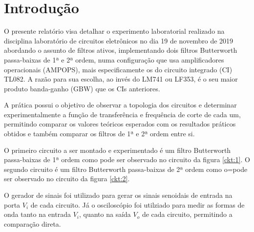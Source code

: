 \section{Introdução}

O presente relatório visa detalhar o experimento laboratorial realizado na disciplina laboratório de circuitos eletrônicos no dia 19 de novembro de 2019 abordando o assunto de filtros ativos, implementando dois filtros Butterworth passa-baixas de 1ª e 2ª ordem, numa configuração que usa   amplificadores operacionais (AMPOPS), mais especificamente os do circuito integrado (CI) TL082. A razão para sua escolha, ao invés do LM741 ou LF353, é o seu maior produto banda-ganho (GBW) que os CIs anteriores.  

A prática possui o objetivo de observar a topologia dos circuitos e determinar experimentalmente a função de transferência e frequência de corte de cada um, permitindo comparar os valores teóricos esperados com os resultados práticos obtidos e também comparar os filtros de 1ª e 2ª ordem entre si.

O primeiro circuito a ser montado e experimentado é um filtro Butterworth passa-baixas de 1ª ordem como pode ser observado no circuito da figura \ref{ckt:1}. O segundo circuito é um filtro Butterworth passa-baixas de 2ª ordem como o=pode ser observado no circuito da figura \ref{ckt:2}.




O gerador de sinais foi utilizado para gerar os sinais senoidais de entrada na porta $V_i$ de cada circuito. Já o osciloscópio foi utilziado para medir as formas de onda tanto na entrada $V_i$, quanto na saída $V_o$ de cada circuito, permitindo a comparação direta.